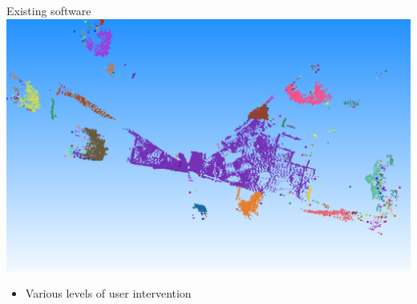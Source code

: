 \documentclass[compress]{beamer}
\begin{document}
\begin{frame}{Existing software}
\includegraphics[height=0.40\textheight]{pics/clustering.png}
\\

\begin{itemize}
\item
  Various levels of user intervention
\end{itemize}


\end{frame}
\end{document}
